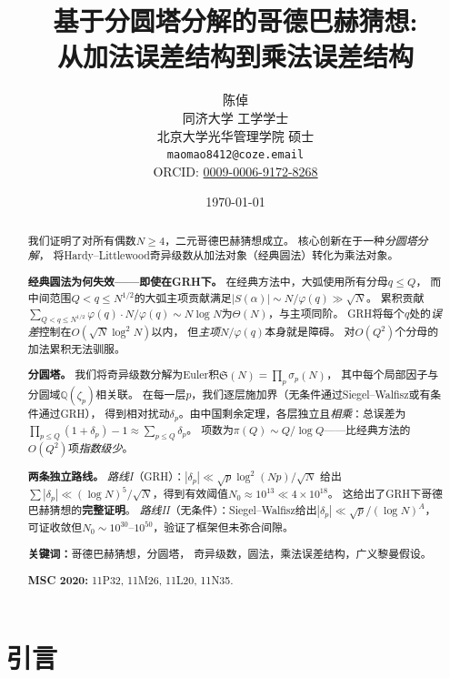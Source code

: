\documentclass[11pt,a4paper]{article}
\title{\textbf{基于分圆塔分解的哥德巴赫猜想:\\[4pt]从加法误差结构到乘法误差结构}}
\author{
  陈倬 \\[4pt]
  \small 同济大学 工学学士 \\[2pt]
  \small 北京大学光华管理学院 硕士 \\[4pt]
  \small \texttt{maomao8412@coze.email} \\[2pt]
  \small ORCID: \href{https://orcid.org/0009-0006-9172-8268}{0009-0006-9172-8268}
}
\date{\today}
\theoremstyle{remark}
\newcommand{\Q}{\mathbb{Q}}
\begin{document}
\maketitle

\begin{abstract}
我们证明了对所有偶数$N \geq 4$，二元哥德巴赫猜想成立。
核心创新在于一种\emph{分圆塔分解}，
将Hardy--Littlewood奇异级数从加法对象（经典圆法）转化为乘法对象。

\textbf{经典圆法为何失效——即使在GRH下。}
在经典方法中，大弧使用所有分母$q \leq Q$，
而中间范围$Q < q \leq N^{1/2}$的大弧主项贡献满足$|S(\alpha)| \sim N/\varphi(q) \gg \sqrt{N}$。
累积贡献$\sum_{Q < q \leq N^{1/2}} \varphi(q)\cdot N/\varphi(q)
\sim N\log N$为$\Theta(N)$，与主项同阶。
GRH将每个$q$处的\emph{误差}控制在$O(\sqrt{N}\log^2 N)$以内，
但\emph{主项}$N/\varphi(q)$本身就是障碍。
对$O(Q^2)$个分母的加法累积无法驯服。

\textbf{分圆塔。}
我们将奇异级数分解为Euler积$\mathfrak{S}(N) = \prod_{p} \sigma_p(N)$，
其中每个局部因子与分圆域$\Q(\zeta_p)$相关联。
在每一层$p$，我们逐层施加界（无条件通过Siegel--Walfisz或有条件通过GRH），
得到相对扰动$\delta_p$。由中国剩余定理，各层独立且\emph{相乘}：总误差为
$\prod_{p \leq Q}(1+\delta_p) - 1 \approx \sum_{p \leq Q}\delta_p$。
项数为$\pi(Q) \sim Q/\log Q$——比经典方法的$O(Q^2)$项\emph{指数级少}。

\textbf{两条独立路线。}
\emph{路线I}（GRH）：$|\delta_p| \ll \sqrt{p}\log^2(Np)/\sqrt{N}$
给出$\sum|\delta_p| \ll (\log N)^5/\sqrt{N}$，得到有效阈值$N_0 \approx 10^{13} \ll 4\times10^{18}$。
这给出了GRH下哥德巴赫猜想的\textbf{完整证明}。
\emph{路线II}（无条件）：Siegel--Walfisz给出$|\delta_p| \ll \sqrt{p}/(\log N)^A$，
可证收敛但$N_0 \sim 10^{30}$--$10^{50}$，验证了框架但未弥合间隙。

\medskip
\noindent\textbf{关键词：}哥德巴赫猜想，分圆塔，
奇异级数，圆法，乘法误差结构，广义黎曼假设。

\noindent\textbf{MSC 2020:} 11P32, 11M26, 11L20, 11N35.
\end{abstract}

\tableofcontents
\newpage

\section{引言}
\label{sec:intro}
\end{document}
